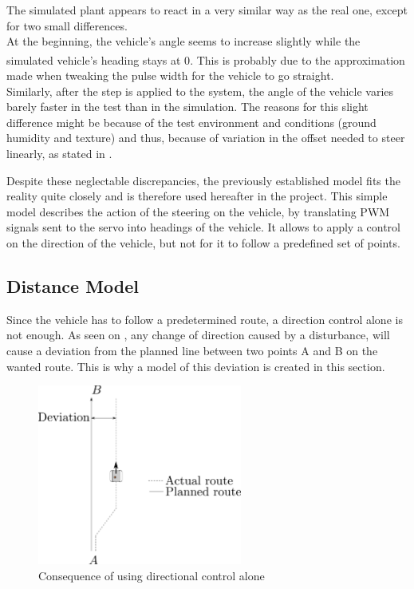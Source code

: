 The simulated plant appears to react in a very similar way as the real one, except for two small differences.\\
At the beginning, the vehicle's angle seems to increase slightly while the simulated vehicle's heading stays at \si{0^{\circ}}. This is probably due to the approximation made when tweaking the pulse width for the vehicle to go straight.\\
Similarly, after the step is applied to the system, the angle of the vehicle varies barely faster in the test than in the simulation. The reasons for this slight difference might be because of the test environment and conditions (ground humidity and texture) and thus, because of variation in the offset needed to steer linearly, as stated in .

Despite these neglectable discrepancies, the previously established model fits the reality quite closely and is therefore used hereafter in the project. This simple model describes the action of the steering on the vehicle, by translating PWM signals sent to the servo into headings of the vehicle. It allows to apply a control on the direction of the vehicle, but not for it to follow a predefined set of points.

\subsection{Distance Model}
Since the vehicle has to follow a predetermined route, a direction control alone is not enough. As seen on , any change of direction caused by a disturbance, will cause a deviation from the planned line between two points A and B on the wanted route. This is why a model of this deviation is created in this section.

\begin{figure}[H]
	\centering
	\includegraphics[width=0.6\textwidth]{figures/steeringDeviation.pdf}
	\caption{Consequence of using directional control alone}
	\label{SteeringDeviation}
\end{figure}

